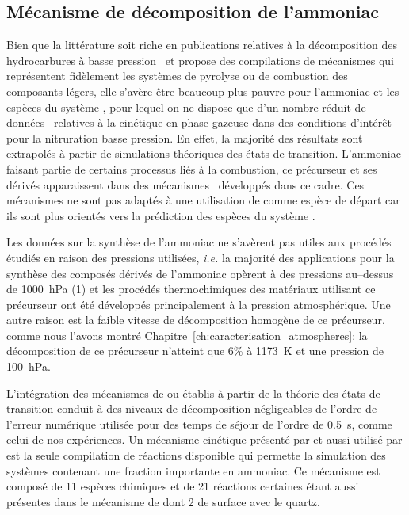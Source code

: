 \subsection{Mécanisme de décomposition de l'ammoniac}
\label{sec:mecanisme-ammoniac}

Bien que la littérature soit riche en publications relatives à la décomposition des hydrocarbures à basse pression~\cite{Becker1998177,Becker1998201,Becker1998213,Becker1998225,Norinaga2005,Norinaga2007,Norinaga2007ii,Norinaga2009,Khan2008} et propose des compilations de mécanismes qui représentent fidèlement les systèmes de pyrolyse ou de combustion des composants légers, elle s'avère être beaucoup plus pauvre pour l'ammoniac et les espèces du système , pour lequel on ne dispose que d'un nombre réduit de données~\cite{Dirtu2006,Odochian2011,Hwang2003,Klippenstein2009} relatives à la cinétique en phase gazeuse dans des conditions d'intérêt pour la nitruration basse pression. En effet, la majorité des résultats sont extrapolés à partir de simulations théoriques des états de transition. L'ammoniac faisant partie de certains processus liés à la combustion, ce précurseur et ses dérivés apparaissent dans des mécanismes~\cite{Grimech,AAUmech} développés dans ce cadre. Ces mécanismes ne sont pas adaptés à une utilisation de  comme espèce de départ car ils sont plus orientés vers la prédiction des espèces du système . 

Les données sur la synthèse de l'ammoniac ne s'avèrent pas utiles aux procédés étudiés en raison des pressions utilisées, \emph{i.e.} la majorité des applications pour la synthèse des composés dérivés de l'ammoniac opèrent à des pressions au--dessus de \SI{1000}{\hecto\pascal} (\SI{1}{\atm}) et les procédés thermochimiques des matériaux utilisant ce précurseur ont été développés principalement à la pression atmosphérique. Une autre raison est la faible vitesse de décomposition homogène de ce précurseur, comme nous l'avons montré Chapitre~\ref{ch:caracterisation_atmospheres}: la décomposition de ce précurseur n'atteint que 6\% à \SI{1173}{\kelvin} et une pression de \SI{100}{\hecto\pascal}.

L'intégration des mécanismes de \citet{Klippenstein2009} ou \citet{Hwang2003} \textendash{} établis à partir de la théorie des états de transition \textendash{} conduit à des niveaux de décomposition négligeables \textendash{} de l'ordre de l'erreur numérique utilisée \textendash{} pour des temps de séjour de l'ordre de \SI{0,5}{\second}, comme celui de nos expériences. Un mécanisme cinétique présenté par \citet{Dirtu2006} et aussi utilisé par \citet{Odochian2011} est la seule compilation de réactions disponible qui permette la simulation des systèmes contenant une fraction importante en ammoniac. Ce mécanisme est composé de 11 espèces chimiques et de 21 réactions \textendash{} certaines étant aussi présentes dans le mécanisme de \citet{AAUmech} \textendash{} dont 2 de surface avec le quartz. 

